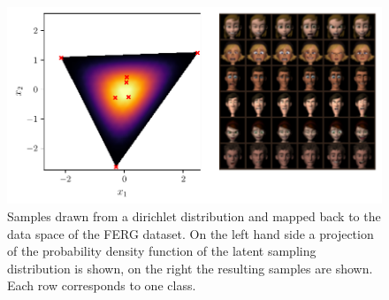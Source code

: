 \begin{figure}[htpb]
	\centering
	\includegraphics[width=1\linewidth]{figures/samples/aa_ferg.pdf}
	\caption{Samples drawn from a dirichlet distribution and mapped back to
		the data space of the FERG dataset. On the left hand side a
		projection of the probability density function of the latent
		sampling distribution is shown, on the right the resulting samples
		are shown. Each row corresponds to one class.}%
	\label{fig:aa_ferg}
\end{figure}

